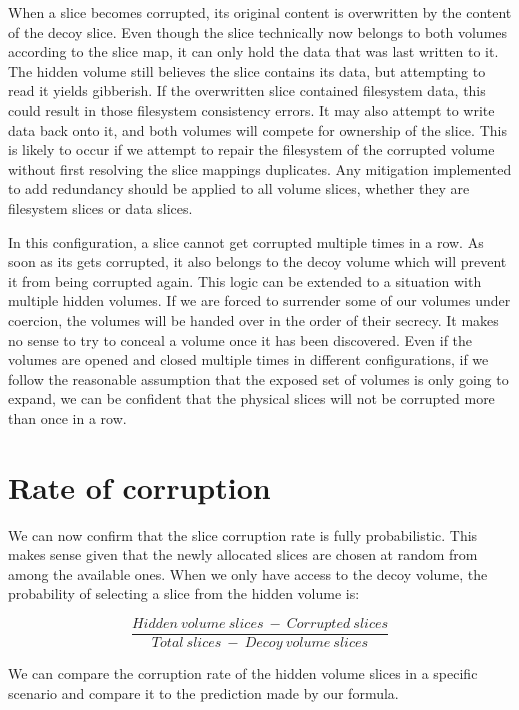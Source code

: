 \documentclass[a4paper,11pt,oneside]{report}
\begin{document}
When a slice becomes corrupted, its original content is overwritten by the content of the decoy slice. Even though the slice technically now belongs to both volumes according to the slice map, it can only hold the data that was last written to it. The hidden volume still believes the slice contains its data, but attempting to read it yields gibberish. If the overwritten slice contained filesystem data, this could result in those filesystem consistency errors. It may also attempt to write data back onto it, and both volumes will compete for ownership of the slice. This is likely to occur if we attempt to repair the filesystem of the corrupted volume without first resolving the slice mappings duplicates. Any mitigation implemented to add redundancy should be applied to all volume slices, whether they are filesystem slices or data slices.

In this configuration, a slice cannot get corrupted multiple times in a row. As soon as its gets corrupted, it also belongs to the decoy volume which will prevent it from being corrupted again. This logic can be extended to a situation with multiple hidden volumes. If we are forced to surrender some of our volumes under coercion, the volumes will be handed over in the order of their secrecy. It makes no sense to try to conceal a volume once it has been discovered. Even if the volumes are opened and closed multiple times in different configurations, if we follow the reasonable assumption that the exposed set of volumes is only going to expand, we can be confident that the physical slices will not be corrupted more than once in a row.

\section{Rate of corruption}

We can now confirm that the slice corruption rate is fully probabilistic. This makes sense given that the newly allocated slices are chosen at random from among the available ones. When we only have access to the decoy volume, the probability of selecting a slice from the hidden volume is:

\[ \frac{Hidden\ volume\ slices\ -\ Corrupted\ slices}{Total\ slices\ -\ Decoy\ volume\ slices} \]

We can compare the corruption rate of the hidden volume slices in a specific scenario and compare it to the prediction made by our formula.
\end{document}
